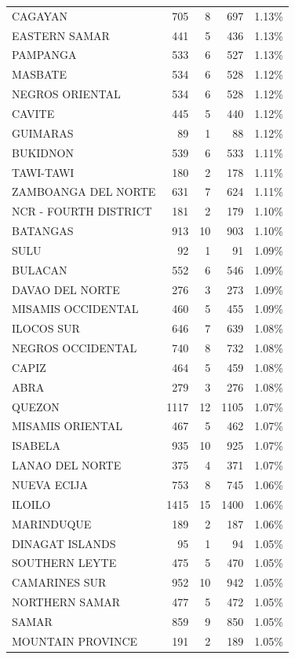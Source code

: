 \begin{tabular}{lrrrr}
CAGAYAN & 705 & 8 & 697 & 1.13\% \\
EASTERN SAMAR & 441 & 5 & 436 & 1.13\% \\
PAMPANGA & 533 & 6 & 527 & 1.13\% \\
MASBATE & 534 & 6 & 528 & 1.12\% \\
NEGROS ORIENTAL & 534 & 6 & 528 & 1.12\% \\
CAVITE & 445 & 5 & 440 & 1.12\% \\
GUIMARAS & 89 & 1 & 88 & 1.12\% \\
BUKIDNON & 539 & 6 & 533 & 1.11\% \\
TAWI-TAWI & 180 & 2 & 178 & 1.11\% \\
ZAMBOANGA DEL NORTE & 631 & 7 & 624 & 1.11\% \\
NCR - FOURTH DISTRICT & 181 & 2 & 179 & 1.10\% \\
BATANGAS & 913 & 10 & 903 & 1.10\% \\
SULU & 92 & 1 & 91 & 1.09\% \\
BULACAN & 552 & 6 & 546 & 1.09\% \\
DAVAO DEL NORTE & 276 & 3 & 273 & 1.09\% \\
MISAMIS OCCIDENTAL & 460 & 5 & 455 & 1.09\% \\
ILOCOS SUR & 646 & 7 & 639 & 1.08\% \\
NEGROS OCCIDENTAL & 740 & 8 & 732 & 1.08\% \\
CAPIZ & 464 & 5 & 459 & 1.08\% \\
ABRA & 279 & 3 & 276 & 1.08\% \\
QUEZON & 1117 & 12 & 1105 & 1.07\% \\
MISAMIS ORIENTAL & 467 & 5 & 462 & 1.07\% \\
ISABELA & 935 & 10 & 925 & 1.07\% \\
LANAO DEL NORTE & 375 & 4 & 371 & 1.07\% \\
NUEVA ECIJA & 753 & 8 & 745 & 1.06\% \\
ILOILO & 1415 & 15 & 1400 & 1.06\% \\
MARINDUQUE & 189 & 2 & 187 & 1.06\% \\
DINAGAT ISLANDS & 95 & 1 & 94 & 1.05\% \\
SOUTHERN LEYTE & 475 & 5 & 470 & 1.05\% \\
CAMARINES SUR & 952 & 10 & 942 & 1.05\% \\
NORTHERN SAMAR & 477 & 5 & 472 & 1.05\% \\
SAMAR & 859 & 9 & 850 & 1.05\% \\
MOUNTAIN PROVINCE & 191 & 2 & 189 & 1.05\% \\

\end{tabular}
